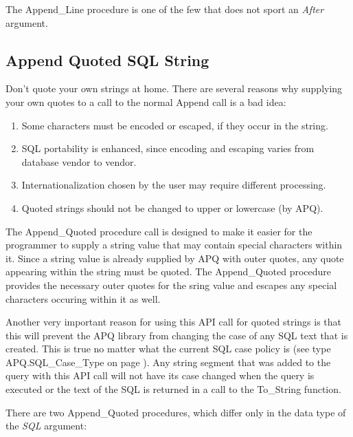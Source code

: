 \documentclass[english,letterpaper]{book}
\begin{document}
The Append\_Line procedure is one of the few that does not sport an
\emph{After} argument.


\subsection{Append Quoted SQL String}

Don't quote your own strings at home. There are several reasons why
supplying your own quotes to a call to the normal Append call is a
bad idea:

\begin{enumerate}
   \item Some characters must be encoded or escaped, if they occur in the string.
   \item SQL portability is enhanced, since encoding and escaping varies from
      database vendor to vendor.
   \item Internationalization chosen by the user may require different processing.
   \item Quoted strings should not be changed to upper or lowercase (by APQ).
\end{enumerate}

The Append\_Quoted procedure call is designed to make it easier for
the programmer to supply a string value that may contain special characters
within it. Since a string value is already supplied by APQ with outer
quotes, any quote appearing within the string must be quoted. The
Append\_Quoted procedure provides the necessary outer quotes
for the sring value and escapes any special characters
occuring within it as well. 

Another very important reason for using this API call for quoted strings
is that this will prevent the APQ library from changing the case of
any SQL text that is created. This is true no matter what the current
SQL case policy is (see type APQ\-.SQL\-\_Case\-\_Type on page \pageref{SQL_Case_Type Choices}).
Any string segment that was added to the query with this API call
will not have its case changed when the query is executed or the text
of the SQL is returned in a call to the To\_String function.

There are two Append\_Quoted procedures, which differ only in the data
type of the \emph{SQL} argument:
\end{document}
